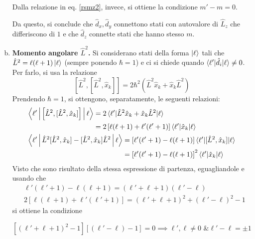 \documentclass[11pt, a4paper]{scrartcl} %
\numberwithin{equation}{subsection}
\theoremstyle{style2}
\theoremstyle{style1}
\newenvironment{boxenv}[1][]{
    \begin{eqbox}[#1]
    }{
   \end{eqbox}
}
\begin{document}
\begin{enumerate}[(a).]
\begin{boxenv}[]
Dalla relazione in eq. \ref{rsmz2}, invece, si ottiene la condizione $m' - m = 0$.
\end{boxenv}
Da questo, si conclude che $\hat{d}_x, \hat{d}_y$ connettono stati con autovalore di $\hat{L}_z$ che differiscono di $1$ e che $\hat{d}_z$ connette stati che hanno stesso $m$.
	\item {\sffamily \bfseries Momento angolare $\hat{L}^2$.}
		Si considerano stati della forma $\ket{\ell } $ tali che $\hat{L}^2 = \ell (\ell +1) \ket{\ell } $ (sempre ponendo $\hbar  =1 $) e ci si chiede quando $\braket{\ell '| \hat{d}_i |\ell } \neq 0$.
		Per farlo, si usa la relazione 
		\begin{equation}
			\left[ \hat{L}^2 , [\hat{L}^2 , \hat{x}_k] \right]  = 2 \hbar ^2 \left(\hat{L}^2 \hat{x}_k + \hat{x}_k \hat{L}^2\right) 
		\end{equation}
		Prendendo $\hbar = 1$, si ottengono, separatamente, le seguenti relazioni:
		\[
		\begin{split}
			&\begin{split}
				\Braket{\ell '|\left[ \hat{L}^2, [\hat{L}^2 , \hat{x}_k] \right] |\ell } &= 2 \braket{\ell '|\hat{L}^2 \hat{x}_k + \hat{x}_k \hat{L}^2|\ell } \\
				&= 2 \left[ \ell (\ell +1) + \ell '(\ell '+1) \right] \braket{\ell '|\hat{x}_k|\ell } 
			\end{split}\\
			&\begin{split}
				\Braket{\ell' |\hat{L}^2 [\hat{L}^2 , \hat{x}_k]- [\hat{L}^2 , \hat{x}_k] \hat{L}^2|\ell } &= \left[ \ell ' (\ell ' +1) - \ell (\ell +1) \right] \braket{\ell '|[\hat{L}^2 , \hat{x}_k] |\ell} \\
															   &=\left[ \ell '(\ell ' +1) - \ell (\ell +1) \right] ^2 \braket{\ell '|\hat{x}_k|\ell } 
			\end{split}
		\end{split}
		\] 
	Visto che sono risultato della stessa espressione di partenza, eguagliandole e usando che
\[
\begin{split}
	&\ell '(\ell '+1) - \ell (\ell +1) = (\ell ' + \ell + 1) (\ell '-\ell )\\
	&2 \left[ \ell (\ell +1) + \ell ' (\ell '+1) \right] = (\ell '+\ell +1)^2 + (\ell '-\ell )^2 - 1
\end{split}
\] 
	si ottiene la condizione 
	\begin{boxenv}[]
	\begin{equation}
		\left[ (\ell '+\ell +1)^2 - 1 \right] \left[ (\ell '-\ell ) - 1 \right]  = 0\implies \ell ',  \ell \neq 0 \text{ \& } \ell '- \ell = \pm 1

\end{equation}
\end{boxenv}
\end{enumerate}
\end{document}
